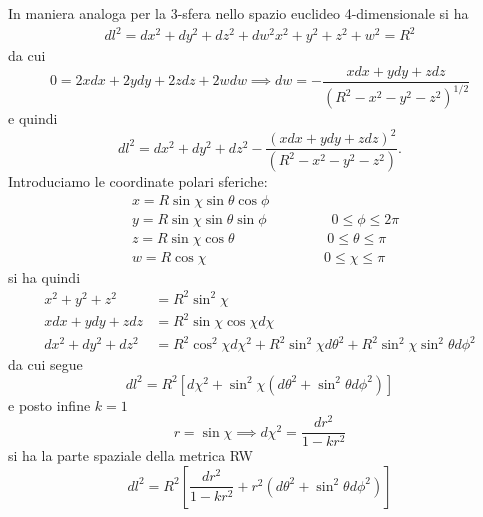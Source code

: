 In maniera analoga per la 3-sfera nello spazio euclideo 4-dimensionale si ha
\begin{subequations}
  \begin{gather}
    dl^2 = dx^2+dy^2+dz^2+dw^2 x^2+y^2+z^2+w^2=R^2
  \end{gather}
\end{subequations}
da cui
\begin{equation}
  0 = 2 x dx + 2 y dy+ 2z dz + 2w dw \implies dw = - \frac {xdx+ydy+zdz}{\left(
      R^2-x^2-y^2-z^2 \right)^{1/2}}
\end{equation}
e quindi
\begin{equation}
dl^2 = dx^2+dy^2+dz^2 - \frac{ \left( xdx+ydy+zdz \right)^2}{\left(
    R^2-x^2-y^2-z^2 \right)}.
\end{equation}
Introduciamo le coordinate polari sferiche:
\begin{equation}
  \begin{split}
    & x=R \sin \chi \sin \theta \cos \phi                 \\
    & y=R \sin \chi \sin \theta \sin \phi~~~~~~~~~~~~~~~~~~~~~0\le \phi  \le 2 \pi \\
    & z=R \sin \chi \cos \theta~~~~~~~~~~~~~~~~~~~~~~~~~~~~~~0\le \theta \le \pi \\
    & w=R \cos \chi ~~~~~~~~~~~~~~~~~~~~~~~~~~~~~~~~~~~~~~0\le \chi \le \pi
\end{split}
\end{equation}
si ha quindi
\begin{subequations}
  \begin{align}
    x^2 + y^2 + z^2     & = R^2 \sin^2 \chi \\
    x dx + y dy + z dz  & = R^2 \sin \chi \cos \chi d \chi \\
    dx^2 + dy^2 + dz^2 & = R^2 \cos^2 \chi d \chi^2 + R^2 \sin^2 \chi d \theta^2
                         + R^2 \sin^2 \chi \sin^2 \theta d \phi^2
  \end{align}
\end{subequations}
da cui segue
\begin{equation}
  dl^2 = R^2 \left[ d \chi^2 + \sin^2 \chi \left( d \theta^2 + \sin^2 \theta d
      \phi^2 \right) \right]
\end{equation}
e posto infine $k=1$
\begin{equation}
  r= \sin \chi \implies d \chi^2 = \frac{dr^2}{1-kr^2}
\end{equation}
si ha la parte spaziale della metrica RW
\begin{equation}
  dl^2 = R^2 \left[ \frac{dr^2} {1-kr^2} + r^2 (d \theta^2+\sin^2 \theta d\phi^2) \right]
\end{equation}

